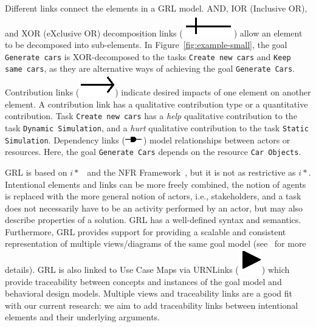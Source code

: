 Different links connect the elements in a GRL model. AND, IOR (Inclusive OR), and XOR (eXclusive OR) decomposition links (\includegraphics[scale=1]{img/decomposition}) allow an element to be decomposed into sub-elements. In Figure~\ref{fig:example-small}, the goal \texttt{Generate cars} is XOR-decomposed to the tasks \texttt{Create new cars} and \texttt{Keep same cars}, as they are alternative ways of achieving the goal \texttt{Generate Cars}. Contribution links (\includegraphics[scale=1]{img/contribution}) indicate desired impacts of one element on another element. A contribution link has a qualitative contribution type or a quantitative contribution. Task  \texttt{Create new cars} has a \emph{help} qualitative contribution to the task \texttt{Dynamic Simulation}, and a \emph{hurt} qualitative contribution to the task \texttt{Static Simulation}. Dependency links (\includegraphics[scale=1]{img/dependency}) model relationships between actors or resources. Here, the goal \texttt{Generate Cars} depends on the resource \texttt{Car Objects}. %

GRL is based on $i*$~\cite{Yu:1997:TMR:827255.827807} and the NFR Framework~\cite{chung2012non}, but it is not as restrictive as $i*$. Intentional elements and links can be more freely combined, the notion of agents is replaced with the more general notion of actors, i.e., stakeholders, and a task does not necessarily have to be an activity performed by an actor, but may also describe properties of a solution. GRL has a well-defined syntax and semantics. Furthermore, GRL provides support for providing a scalable and consistent representation of multiple views/diagrams of the same goal model (see~\cite[Ch.2]{Ghanavati2013} for more details). GRL is also linked to Use Case Maps via URNLinks (\includegraphics[scale=1]{img/urnlink}) which provide traceability between concepts and instances of the goal model and behavioral design models. Multiple views and traceability links are a good fit with our current research: we aim to add traceability links between intentional elements and their underlying arguments. 

